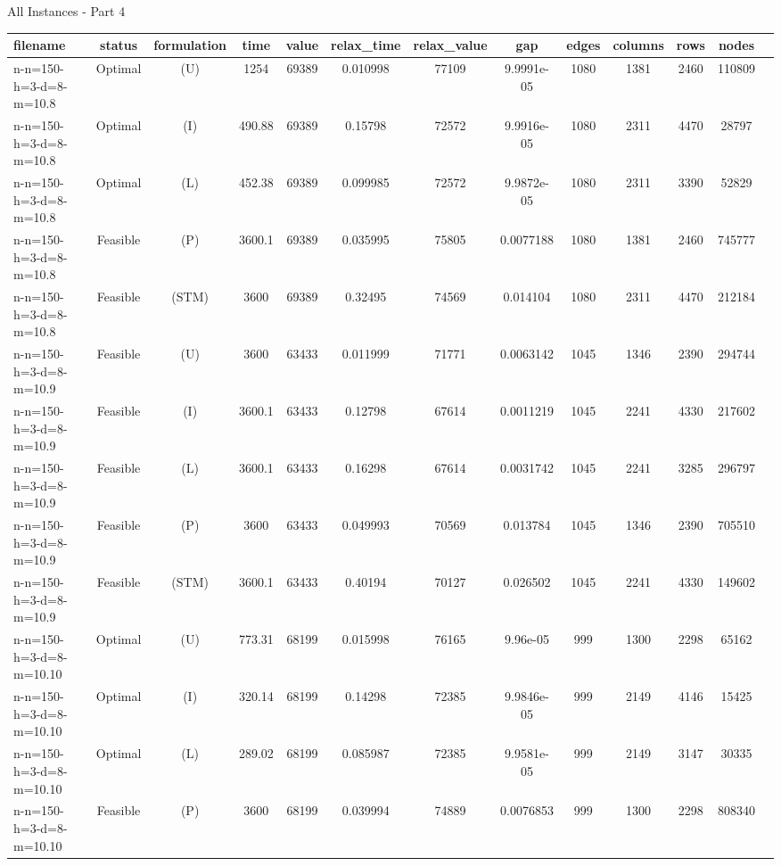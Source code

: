 \documentclass[landscape, a4paper]{article}
\newcommand{\STM}{\ensuremath{\mathrm{STM}}}
\newcommand{\Improved}{\ensuremath{\mathrm{I}}}
\newcommand{\Loose}{\ensuremath{\mathrm{L}}}
\newcommand{\Profit}{\ensuremath{\mathrm{P}}}
\newcommand{\Utility}{\ensuremath{\mathrm{U}}}
\begin{document}
\begin{center}
\newpage
All Instances - Part 4

\begin{tabular}{lcccccccccccc}
filename & status & formulation & time & value & relax\_time & relax\_value & gap & edges & columns & rows & nodes & \\
\hline
n-n=150-h=3-d=8-m=10.8 & Optimal & (\Utility) & 1254 & 69389 & 0.010998 & 77109 & 9.9991e-05 & 1080 & 1381 & 2460 & 110809 & \\
n-n=150-h=3-d=8-m=10.8 & Optimal & (\Improved) & 490.88 & 69389 & 0.15798 & 72572 & 9.9916e-05 & 1080 & 2311 & 4470 & 28797 & \\
n-n=150-h=3-d=8-m=10.8 & Optimal & (\Loose) & 452.38 & 69389 & 0.099985 & 72572 & 9.9872e-05 & 1080 & 2311 & 3390 & 52829 & \\
n-n=150-h=3-d=8-m=10.8 & Feasible & (\Profit) & 3600.1 & 69389 & 0.035995 & 75805 & 0.0077188 & 1080 & 1381 & 2460 & 745777 & \\
n-n=150-h=3-d=8-m=10.8 & Feasible & (\STM) & 3600 & 69389 & 0.32495 & 74569 & 0.014104 & 1080 & 2311 & 4470 & 212184 & \\
n-n=150-h=3-d=8-m=10.9 & Feasible & (\Utility) & 3600 & 63433 & 0.011999 & 71771 & 0.0063142 & 1045 & 1346 & 2390 & 294744 & \\
n-n=150-h=3-d=8-m=10.9 & Feasible & (\Improved) & 3600.1 & 63433 & 0.12798 & 67614 & 0.0011219 & 1045 & 2241 & 4330 & 217602 & \\
n-n=150-h=3-d=8-m=10.9 & Feasible & (\Loose) & 3600.1 & 63433 & 0.16298 & 67614 & 0.0031742 & 1045 & 2241 & 3285 & 296797 & \\
n-n=150-h=3-d=8-m=10.9 & Feasible & (\Profit) & 3600 & 63433 & 0.049993 & 70569 & 0.013784 & 1045 & 1346 & 2390 & 705510 & \\
n-n=150-h=3-d=8-m=10.9 & Feasible & (\STM) & 3600.1 & 63433 & 0.40194 & 70127 & 0.026502 & 1045 & 2241 & 4330 & 149602 & \\
n-n=150-h=3-d=8-m=10.10 & Optimal & (\Utility) & 773.31 & 68199 & 0.015998 & 76165 & 9.96e-05 & 999 & 1300 & 2298 & 65162 & \\
n-n=150-h=3-d=8-m=10.10 & Optimal & (\Improved) & 320.14 & 68199 & 0.14298 & 72385 & 9.9846e-05 & 999 & 2149 & 4146 & 15425 & \\
n-n=150-h=3-d=8-m=10.10 & Optimal & (\Loose) & 289.02 & 68199 & 0.085987 & 72385 & 9.9581e-05 & 999 & 2149 & 3147 & 30335 & \\
n-n=150-h=3-d=8-m=10.10 & Feasible & (\Profit) & 3600 & 68199 & 0.039994 & 74889 & 0.0076853 & 999 & 1300 & 2298 & 808340 & \\

\end{tabular}
\end{center}
\end{document}
